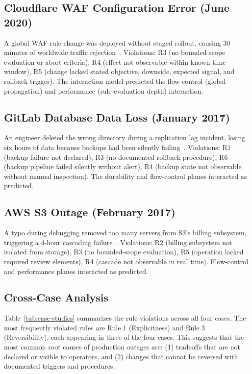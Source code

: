 \documentclass[conference]{IEEEtran}
\begin{document}
\subsection{Cloudflare WAF Configuration Error (June 2020)}

A global WAF rule change was deployed without staged rollout, causing 30 minutes of worldwide traffic rejection~\cite{cloudflare2020}. Violations: R3 (no bounded-scope evaluation or abort criteria), R4 (effect not observable within known time window), R5 (change lacked stated objective, downside, expected signal, and rollback trigger). The interaction model predicted the flow-control (global propagation) and performance (rule evaluation depth) interaction.

\subsection{GitLab Database Data Loss (January 2017)}

An engineer deleted the wrong directory during a replication lag incident, losing six hours of data because backups had been silently failing~\cite{gitlab2017}. Violations: R1 (backup failure not declared), R3 (no documented rollback procedure), R6 (backup pipeline failed silently without alert), R4 (backup state not observable without manual inspection). The durability and flow-control planes interacted as predicted.

\subsection{AWS S3 Outage (February 2017)}

A typo during debugging removed too many servers from S3's billing subsystem, triggering a 4-hour cascading failure~\cite{aws2017}. Violations: R2 (billing subsystem not isolated from storage), R3 (no bounded-scope evaluation), R5 (operation lacked required review elements), R4 (cascade not observable in real time). Flow-control and performance planes interacted as predicted.

\subsection{Cross-Case Analysis}

Table~\ref{tab:case-studies} summarizes the rule violations across all four cases. The most frequently violated rules are Rule 1 (Explicitness) and Rule 3 (Reversibility), each appearing in three of the four cases. This suggests that the most common root causes of production outages are: (1) tradeoffs that are not declared or visible to operators, and (2) changes that cannot be reversed with documented triggers and procedures.
\end{document}
